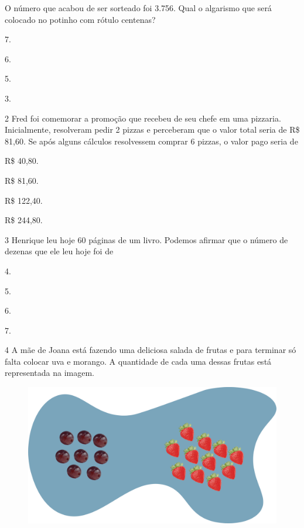 O número que acabou de ser sorteado foi 3.756. Qual o algarismo que será colocado no potinho com rótulo centenas?

\begin{multicols}{2}
\begin{escolha}
\item
  7.
\item
  6.
\item
  5.
\item
  3.
\end{escolha}
\end{multicols}

\num{2} Fred foi comemorar a promoção que recebeu de seu chefe em uma pizzaria. Inicialmente, resolveram pedir 2 pizzas e perceberam que o valor total seria de R\$ 81,60. Se após alguns cálculos resolvessem comprar 6
pizzas, o valor pago seria de


\begin{escolha}
\item
  R\$ 40,80.
\item
  R\$ 81,60.
\item
  R\$ 122,40.
\item
  R\$ 244,80.
\end{escolha}


\num{3} Henrique leu hoje 60 páginas de um livro. Podemos afirmar que o número de dezenas que ele leu hoje foi de

\begin{multicols}{2}
\begin{escolha}
\item
  4.
\item
  5.
\item
  6.
\item
  7.
\end{escolha}
\end{multicols}

\pagebreak
\num{4} A mãe de Joana está fazendo uma deliciosa salada de frutas e para terminar só falta colocar uva e morango. A quantidade de cada uma dessas frutas está representada na imagem.

\begin{figure}[htpb!]
\centering
\includegraphics[width=.8\textwidth]{./media/image114.png}
\end{figure}

